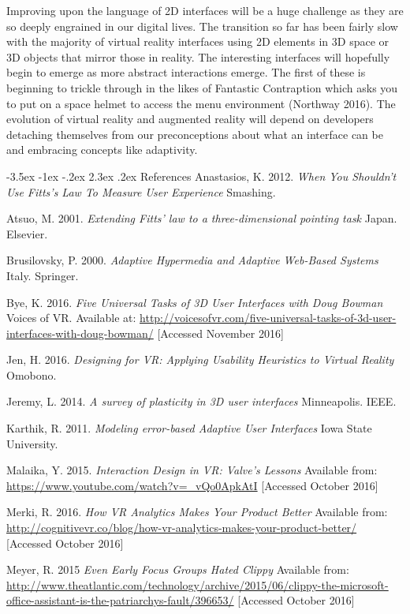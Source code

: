 \documentclass[9pt,twocolumn]{article}
\makeatletter
\renewcommand{\section}{\@startsection {section}{1}{\z@}%
             {-3.5ex \@plus -1ex \@minus -.2ex}%
             {2.3ex \@plus .2ex}%
             {\normalfont\Large\scshape\bfseries}}
\makeatother
\begin{document}
Improving upon the language of 2D interfaces will be a huge challenge as they are so deeply engrained in our digital lives. The transition so far has been fairly slow with the majority of virtual reality interfaces using 2D elements in 3D space or 3D objects that mirror those in reality. The interesting interfaces will hopefully begin to emerge as more abstract interactions emerge. The first of these is beginning to trickle through in the likes of Fantastic Contraption which asks you to put on a space helmet to access the menu environment (Northway 2016). The evolution of virtual reality and augmented reality will depend on developers detaching themselves from our preconceptions about what an interface can be and embracing concepts like adaptivity.

\pagebreak

\section{References}
Anastasios, K. 2012. \emph{When You Shouldn't Use Fitts's Law To Measure User Experience} Smashing. 

Atsuo, M. 2001. \emph{Extending Fitts' law to a three-dimensional pointing task} Japan. Elsevier. 

Brusilovsky, P. 2000. \emph{Adaptive Hypermedia and Adaptive Web-Based Systems} Italy. Springer.

Bye, K. 2016. \emph{Five Universal Tasks of 3D User Interfaces with Doug Bowman} Voices of VR. Available at: \url{http://voicesofvr.com/five-universal-tasks-of-3d-user-interfaces-with-doug-bowman/} [Accessed November 2016]

Jen, H. 2016. \emph{Designing for VR: Applying Usability Heuristics to Virtual Reality} Omobono. 

Jeremy, L. 2014. \emph{A survey of plasticity in 3D user interfaces} Minneapolis. IEEE. 

Karthik, R. 2011. \emph{Modeling error-based Adaptive User Interfaces} Iowa State University. 

Malaika, Y. 2015. \emph{Interaction Design in VR: Valve's Lessons } Available from: \url{https://www.youtube.com/watch?v=_vQo0ApkAtI} [Accessed October 2016]

Merki, R. 2016. \emph{How VR Analytics Makes Your Product Better} Available from: \url{http://cognitivevr.co/blog/how-vr-analytics-makes-your-product-better/} [Accessed October 2016]

Meyer, R. 2015 \emph{Even Early Focus Groups Hated Clippy} Available from: \url{http://www.theatlantic.com/technology/archive/2015/06/clippy-the-microsoft-office-assistant-is-the-patriarchys-fault/396653/} [Accessed October 2016]
\end{document}
